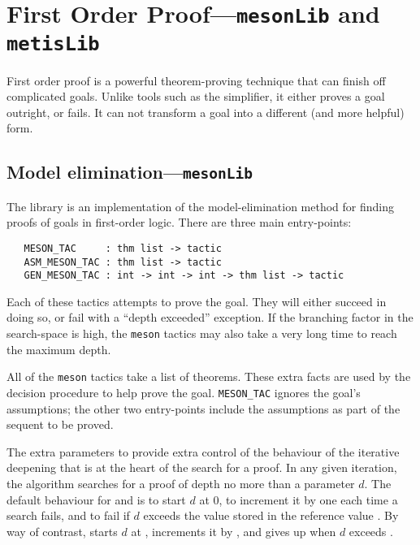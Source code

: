 \section{First Order Proof---\texttt{mesonLib} and \texttt{metisLib}}
\label{sec:first-order-proof}

First order proof is a powerful theorem-proving technique that can
finish off complicated goals.  Unlike tools such as the simplifier, it
either proves a goal outright, or fails.  It can not transform a goal
into a different (and more helpful) form.

\subsection{Model elimination---\texttt{mesonLib}}
\label{sec:mesonLib}


The  library is an implementation of the
model-elimination method for finding proofs of goals in first-order
logic.  There are three main entry-points:
\begin{hol}
\begin{verbatim}
   MESON_TAC     : thm list -> tactic
   ASM_MESON_TAC : thm list -> tactic
   GEN_MESON_TAC : int -> int -> int -> thm list -> tactic
\end{verbatim}
\end{hol}

Each of these tactics attempts to prove the goal.  They will either
succeed in doing so, or fail with a ``depth exceeded'' exception.  If
the branching factor in the search-space is high, the \texttt{meson}
tactics may also take a very long time to reach the maximum depth.

All of the \texttt{meson} tactics take a list of theorems.  These
extra facts are used by the decision procedure to help prove the goal.
\texttt{MESON\_TAC} ignores the goal's assumptions; the other two
entry-points include the assumptions as part of the sequent to be
proved.

The extra parameters to  provide extra control of
the behaviour of the iterative deepening that is at the heart of the
search for a proof.  In any given iteration, the algorithm searches
for a proof of depth no more than a parameter $d$.  The default
behaviour for  and  is to start $d$
at 0, to increment it by one each time a search fails, and to fail if
$d$ exceeds the value stored in the reference value
.  By way of contrast,
 starts $d$ at , increments
it by , and gives up when $d$ exceeds .

